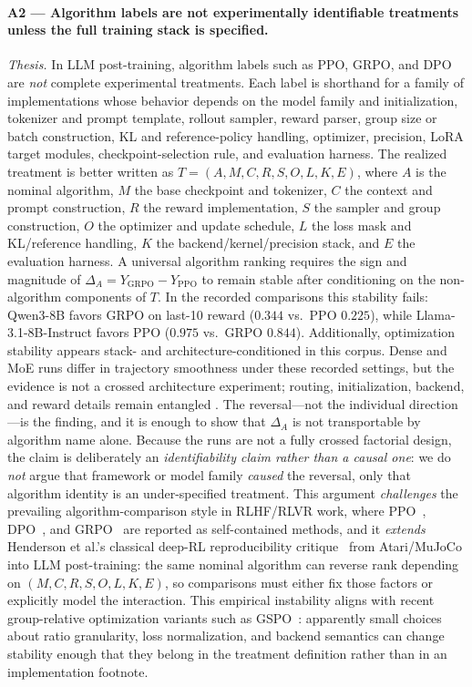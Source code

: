 \documentclass[12pt,a4paper]{report}
\begin{document}
\paragraph{A2 --- Algorithm labels are not experimentally identifiable treatments unless the full training stack is specified.}
\emph{Thesis.} In LLM post-training, algorithm labels such as PPO, GRPO, and DPO are \emph{not} complete experimental treatments. Each label is shorthand for a family of implementations whose behavior depends on the model family and initialization, tokenizer and prompt template, rollout sampler, reward parser, group size or batch construction, KL and reference-policy handling, optimizer, precision, LoRA target modules, checkpoint-selection rule, and evaluation harness. The realized treatment is better written as $T=(A,M,C,R,S,O,L,K,E)$, where $A$ is the nominal algorithm, $M$ the base checkpoint and tokenizer, $C$ the context and prompt construction, $R$ the reward implementation, $S$ the sampler and group construction, $O$ the optimizer and update schedule, $L$ the loss mask and KL/reference handling, $K$ the backend/kernel/precision stack, and $E$ the evaluation harness. A universal algorithm ranking requires the sign and magnitude of $\Delta_A = Y_{\text{GRPO}} - Y_{\text{PPO}}$ to remain stable after conditioning on the non-algorithm components of $T$. In the recorded comparisons this stability fails: Qwen3-8B favors GRPO on last-10 reward ($0.344$ vs.\ PPO $0.225$), while Llama-3.1-8B-Instruct favors PPO ($0.975$ vs.\ GRPO $0.844$). 
Additionally, optimization stability appears stack- and architecture-conditioned in this corpus. Dense and MoE runs differ in trajectory smoothness under these recorded settings, but the evidence is not a crossed architecture experiment; routing, initialization, backend, and reward details remain entangled \citep{deepseek2025r1, zheng2025gspo}.
The reversal---not the individual direction---is the finding, and it is enough to show that $\Delta_A$ is not transportable by algorithm name alone. Because the runs are not a fully crossed factorial design, the claim is deliberately an \emph{identifiability claim rather than a causal one}: we do \emph{not} argue that framework or model family \emph{caused} the reversal, only that algorithm identity is an under-specified treatment. This argument \emph{challenges} the prevailing algorithm-comparison style in RLHF/RLVR work, where PPO~\citep{schulman2017proximal}, DPO~\citep{rafailov2024direct}, and GRPO~\citep{shao2024deepseekmath} are reported as self-contained methods, and it \emph{extends} Henderson et al.'s classical deep-RL reproducibility critique~\citep{henderson2018deep} from Atari/MuJoCo into LLM post-training: the same nominal algorithm can reverse rank depending on $(M,C,R,S,O,L,K,E)$, so comparisons must either fix those factors or explicitly model the interaction.
This empirical instability aligns with recent group-relative optimization variants such as GSPO~\citep{zheng2025gspo}: apparently small choices about ratio granularity, loss normalization, and backend semantics can change stability enough that they belong in the treatment definition rather than in an implementation footnote.
\end{document}
